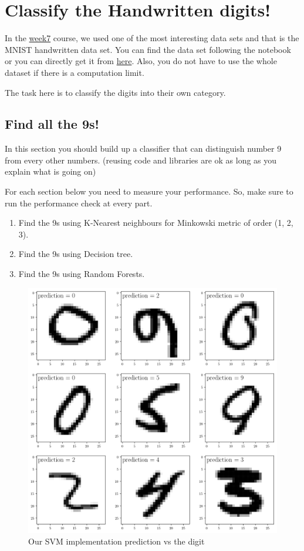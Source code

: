 \documentclass[12pt,letterpaper]{article}
\begin{document}
\section*{Classify the Handwritten digits!}
In the \href{https://abtinshahidi.github.io/teaching/2019-spring-foundation-machine-learning/week7}{week7} course, we used one of the most interesting data sets and that is the MNIST handwritten data set. You can find the data set following the notebook or you can directly get it from \href{http://yann.lecun.com/exdb/mnist/}{here}. Also, you do not have to use the whole dataset if there is a computation limit.

The task here is to classify the digits into their own category.

\subsection*{Find all the 9s!}
In this section you should build up a classifier that can distinguish number 9 from every other numbers. (reusing code and libraries are ok as long as you explain what is going on)

For each section below you need to measure your performance. So, make sure to run the performance check at every part.

\begin{enumerate}
\item Find the 9s using K-Nearest neighbours for Minkowski metric of order (1, 2, 3). 
\item Find the 9s using Decision tree. 
\item Find the 9s using Random Forests.
\end{enumerate}

\begin{figure}[ht]
\begin{center}
\includegraphics[scale=0.35]{week7_98_0.png}
\end{center}
\caption{Our SVM implementation prediction vs the digit}
\end{figure}
\end{document}
